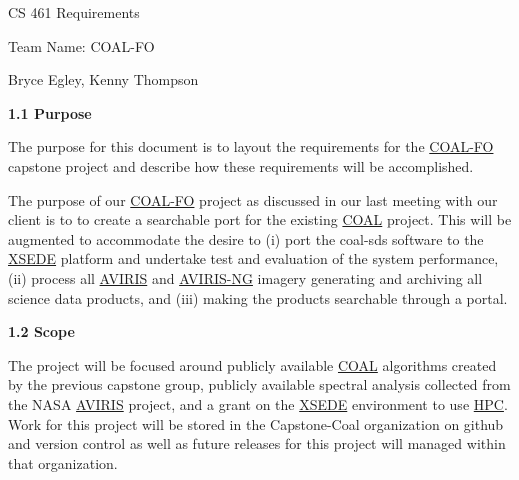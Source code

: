 \documentclass[a4paper,12pt]{article}
\begin{document}
\sloppy

\noindent CS 461 Requirements\newline


\noindent Team Name: COAL-FO\newline


\noindent Bryce Egley, Kenny Thompson\newline


\newline


\noindent \textbf{1.1 Purpose}\newline


\noindent The purpose for this document is to layout the requirements for the \href{http://eecs.oregonstate.edu/capstone/submission/?page=preview\&pid=320}{COAL-FO} capstone project and describe how these requirements will be accomplished. \newline

\noindent The purpose of our \href{http://eecs.oregonstate.edu/capstone/submission/?page=preview\&pid=320}{COAL-FO} project as discussed in our last meeting with our client is to to create a searchable port for the existing \href{https://capstone-coal.github.io/}{COAL} project. This will be augmented to accommodate the desire to (i) port the coal-sds software to the \href{https://www.xsede.org/}{XSEDE} platform and undertake test and evaluation of the system performance, (ii) process all \href{https://aviris.jpl.nasa.gov/}{AVIRIS} and \href{https://aviris-ng.jpl.nasa.gov/}{AVIRIS-NG} imagery generating and archiving all science data products, and (iii) making the products searchable through a portal. \newline

\noindent \textbf{1.2 Scope}\newline


\noindent The project will be focused around publicly available \href{https://capstone-coal.github.io/}{COAL} algorithms created by the previous capstone group, publicly available spectral analysis collected from the NASA \href{https://aviris.jpl.nasa.gov/}{AVIRIS} project, and a grant on the \href{https://www.xsede.org/}{XSEDE} environment to use \href{https://en.wikipedia.org/wiki/Supercomputer}{HPC}. Work for this project will be stored in the Capstone-Coal organization on github and version control as well as future releases for this project will managed within that organization.\newline
\end{document}
